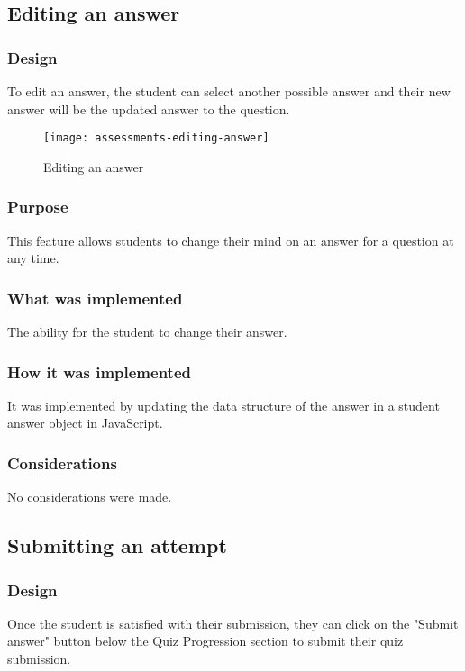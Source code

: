 \subsection{Editing an answer}

\subsubsection{Design}
To edit an answer, the student can select another possible answer and their new answer will be the updated answer to the question.

\begin{figure}[h!]
	\centering
	\texttt{[image: assessments-editing-answer]}
	\caption{Editing an answer}
\end{figure}

\subsubsection{Purpose}
This feature allows students to change their mind on an answer for a question at any time.

\subsubsection{What was implemented}
The ability for the student to change their answer.

\subsubsection{How it was implemented}
It was implemented by updating the data structure of the answer in a student answer object in JavaScript.

\subsubsection{Considerations}
No considerations were made.

\subsection{Submitting an attempt}

\subsubsection{Design}
Once the student is satisfied with their submission, they can click on the "Submit answer" button below the Quiz Progression section to submit their quiz submission.

